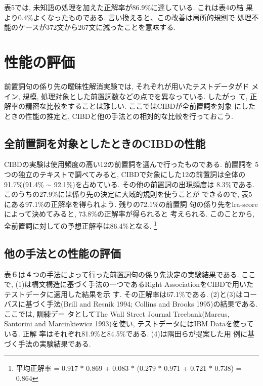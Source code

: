 表5では, 未知語の処理を加えた正解率が86.9\%に達している. これは表4の結
果より0.4\%よくなったものである. 言い換えると、この改善は局所的規則で
処理不能のケースが372文から267文に減ったことを意味する. 

\section {性能の評価}

前置詞句の係り先の曖昧性解消実験では, それぞれが用いたテストデータがド
メイン, 規模, 処理対象とした前置詞数などの点でを異なっている. したがっ
て, 正解率の精密な比較をすることは難しい. ここではCIBDが全前置詞を対象
にしたときの性能の推定と, CIBDと他の手法との相対的な比較を行っておこう.

\subsection {全前置詞を対象としたときのCIBDの性能}

CIBDの実験は使用頻度の高い12の前置詞を選んで行ったものである. 前置詞を
5つの独立のテキストで調べてみると, CIBDで対象にした12の前置詞は全体の
91.7\%(91.4\% $\sim$ 92.1\%)を占めている. その他の前置詞の出現頻度は
8.3\%である. このうちの27.9\%には係り先の決定に大域的規則を使うことが
できるので, 表5にある97.1\%の正解率を得られよう. 残りの72.1\%の前置詞
句の係り先をlra-scoreによって決めてみると, 73.8\%の正解率が得られると
考えられる. このことから, 全前置詞に対しての予想正解率は86.4\%となる.
\footnote{平均正解率 = 0.917 $\ast$ 0.869 + 0.083 $\ast$ (0.279 $\ast$
0.971 + 0.721 $\ast$ 0.738) = 0.864}

\subsection {他の手法との性能の評価}

表６は４つの手法によって行った前置詞句の係り先決定の実験結果である.
ここで, (1)は構文構造に基づく手法の一つであるRight
Association\hspace*{1.5mm}をCIBDで用いたテストデータに適用した結果を示
す. その正解率は67.1\%である. (2)と(3)はコーバスに基づく手法(Brill and
Resnik 1994; Collins and Brooks 1995)の結果である. ここでは, 訓練デー
タとしてThe Wall Street Journal Treebank(Marcus, Santorini and
Marcinkiewicz 1993)を使い, テストデータにはIBM Dataを使っている. 正解
率はそれぞれ81.9\%と84.5\%である. \hspace*{2mm}(4)は隅田らが提案した用
例に基づく手法の実験結果である. 

